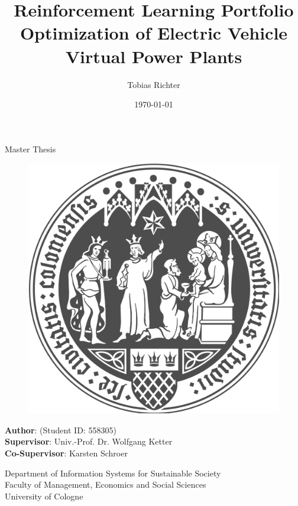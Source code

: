 \documentclass[a4paper, 12pt]{article}
\author{Tobias Richter}
\date{\today}
\title{Reinforcement Learning Portfolio Optimization of Electric Vehicle Virtual Power Plants}
\newcommand{\studentID}{558305}
\newcommand{\thesistype}{Master Thesis}
\newcommand{\supervisor}{Univ.-Prof. Dr. Wolfgang Ketter}
\newcommand{\cosupervisor}{Karsten Schroer}
\begin{document}
\makeatletter
\begin{titlepage}
    \begin{center}
        \vspace*{1cm}

        \Large
        \textbf{\@title{}}

        \vspace{1.5cm}

        \thesistype{}

        \vspace{1cm}

        \begin{figure}[htbp]
             \centering
             \includegraphics[width=.5\linewidth]{./fig/UoC-logo.png}
        \end{figure}

        \vspace{1cm}

        \large
        \textbf{Author}: \@author{} (Student ID: \studentID{})\\
        \large
        \textbf{Supervisor}: \supervisor{}\\
        \large
        \textbf{Co-Supervisor}: \cosupervisor{}

        \vspace{1cm}
        \large
        Department of Information Systems for Sustainable Society\\
        Faculty of Management, Economics and Social Sciences\\
        University of Cologne\\

        \vspace{1cm}
        \@date{}

    \end{center}
\end{titlepage}
\makeatother
\clearpage
\thispagestyle{empty}
\end{document}
